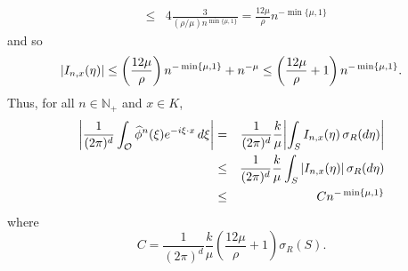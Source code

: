 \documentclass[smallextended]{svjour3}
\theoremstyle{remark}
\renewenvironment{proof}[1][\proofname]{\renewcommand\xproofname{#1}\xproof}{\endxproof}
\newcommand{\f}[2]{\frac{#1}{#2}}
\begin{document}
\begin{proof}
\begin{eqnarray*}
{    }\\
    &\leq& 4\frac{3}{(\rho/\mu) n^{\min\{\mu,1\}}}=\frac{12\mu}{\rho}n^{-\min\{\mu,1\}}
\end{eqnarray*}
and so
\begin{equation*}
    \abs{I_{n,x}(\eta)}\leq \left(\frac{12\mu}{\rho}\right)n^{-\min\{\mu,1\}}+n^{-\mu}\leq \left(\frac{12\mu}{\rho}+1\right)n^{-\min\{\mu,1\}}.
\end{equation*}
Thus, for all $n\in\mathbb{N}_+$ and $x\in K$,
\begin{eqnarray*}
\abs{\f{1}{(2\pi)^d}\int_{\mathcal{O}}\widehat{\phi}^n(\xi)e^{-i\xi\cdot x}\,d\xi}
&=&\frac{1}{(2\pi)^d}\f{k}{\mu}\abs{\int_S I_{n,x}(\eta)\,\sigma_R(d\eta)} \\
&\leq& \frac{1}{(2\pi)^d}\f{k}{\mu}\int_S \abs{I_{n,x}(\eta)}\,\sigma_R(d\eta)\\
&\leq& Cn^{-\min\{\mu,1\}}
\end{eqnarray*}
where
\begin{equation*}
    C=\f{1}{(2\pi)^d} \f{k}{\mu} \left(\frac{12\mu}{\rho}+1\right)\sigma_R(S).
\end{equation*}
\end{proof}
\end{document}
